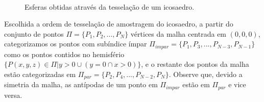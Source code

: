 \documentclass[
    12pt,                %
    oneside,            %
    a4paper,            %
    english,            %
    french,                %
    spanish,            %
    brazil                %
    ]{abntex2}
\begin{document}
\begin{figure}[ht]
\centering
\captionsetup[subfloat]{farskip=0pt,nearskip=0pt}
\centering
    \hspace{1em}
    \\
    \hspace{1em}
     \caption{Esferas obtidas através da tesselação de um icosaedro.}
    \label{fig::icosphere}
\end{figure}

Escolhida a ordem de tesselação de amostragem do icosaedro, a partir do conjunto de pontos $\Pi = \{P_1, P_2, \dots, P_N\}$ vértices da malha centrada em $(0,0,0)$, categorizamos os pontos com subíndice ímpar $\Pi_{impar} = \{P_1, P_3, ..., P_{N-3}, P_{N-1}\}$ como os pontos contidos no hemisfério $\{P(x, y, z) \in \Pi | y > 0 \cup (y = 0 \cap x > 0)\}$, e o restante dos pontos da malha estão categorizadas em $\Pi_{par} = \{P_2, P_4, ..., P_{N-2}, P_{N}\}$. Observe que, devido a simetria da malha, as antípodas de um ponto em $\Pi_{impar}$ estão em $\Pi_{par}$ e vice versa.
\end{document}
